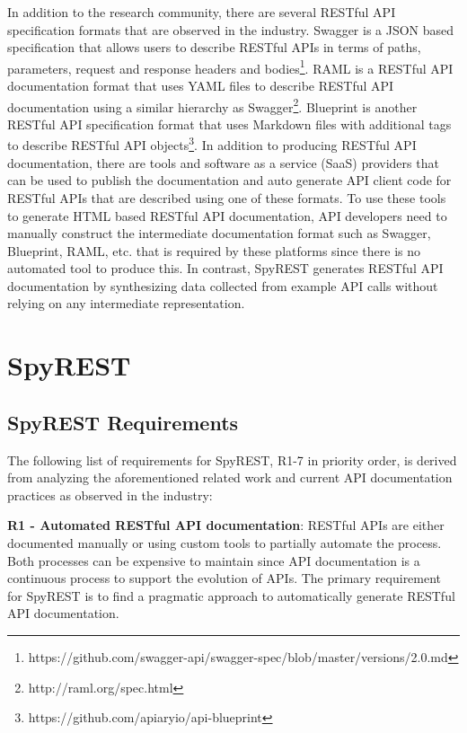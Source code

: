 \documentclass[conference]{IEEEtran}
\begin{document}
In addition to the research community, there are several RESTful API specification formats that are observed in the industry. Swagger is a JSON based specification that allows users to describe RESTful APIs in terms of paths, parameters, request and response headers and bodies\footnote{https://github.com/swagger-api/swagger-spec/blob/master/versions/2.0.md}. RAML is a RESTful API documentation format that uses YAML files to describe RESTful API documentation using a similar hierarchy as Swagger\footnote{http://raml.org/spec.html}. Blueprint is another RESTful API specification format that uses Markdown files with additional tags to describe RESTful API objects\footnote{https://github.com/apiaryio/api-blueprint}. In addition to producing RESTful API documentation, there are tools and software as a service (SaaS) providers that can be used to publish the documentation and auto generate API client code for RESTful APIs that are described using one of these formats. To use these tools to generate HTML based RESTful API documentation, API developers need to manually construct the intermediate documentation format such as Swagger, Blueprint, RAML, etc. that is required by these platforms since there is no automated tool to produce this. In contrast, SpyREST generates RESTful API documentation by synthesizing data collected from example API calls without relying on any intermediate representation.


\section{SpyREST} %
\label{sec:spyrest}

\subsection{SpyREST Requirements} %
\label{sub:spyrest_requirements}

The following list of requirements for SpyREST, R1-7 in priority order, is derived from analyzing the aforementioned related work and current API documentation practices as observed in the industry:

  \textbf{R1 - Automated RESTful API documentation}: RESTful APIs are either documented manually or using custom tools to partially automate the process. Both processes can be expensive to maintain since API documentation is a continuous process to support the evolution of APIs. The primary requirement for SpyREST is to find a pragmatic approach to automatically generate RESTful API documentation.
\end{document}
